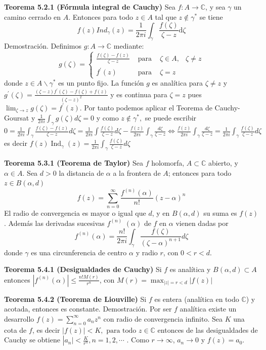 \documentclass[a4paper, 11pt]{extarticle}
\newcommand{\tma}[1]{\textcolor{rojo}{\textbf{Teorema #1}}}
\newcommand{\dem}[1]{\textcolor{gris}{\small{Demostración. #1}}}
\begin{document}
\begin{multicols*}{2}
\tma{5.2.1 (Fórmula integral de Cauchy)} Sea \(f: A \rightarrow  \mathbb{C}\),
y sea \(\gamma\) un camino cerrado en \(A\). Entonces para todo \(z \in A\) tal que \(z \not \in \gamma^*\)
 se tiene \[ f(z) Ind_\gamma(z) = \frac{1}{2\pi i}\int _\gamma
\frac{f(\zeta)}{\zeta - z} \text{d}\zeta   \]
\dem{  Definimos $g: A \rightarrow \mathbb{C}$ mediante:
$$
g(\zeta)=\left\{\begin{array}{cccc}
\frac{f(\zeta)-f(z)}{\zeta-z} & \text { para } & \zeta \in A, & \zeta \neq z \\
f^{\prime}(z) & \text { para } & \zeta=z
\end{array}\right.
$$
donde $z \in A \backslash \gamma^{*}$ es un punto fijo. La función $g$ es analítica para $\zeta \neq z$ y
$
g^{\prime}(\zeta)=\frac{(\zeta-z) f^{\prime}(\zeta)-f(\zeta)+f(z)}{(\zeta-z)^{2}}
$
y es continua para $\zeta=z$ pues
$
\lim _{\zeta \rightarrow z} g(\zeta)=f^{\prime}(z)
$.
Por tanto podemos aplicar el Teorema de Cauchy-Goursat y 
$
\frac{1}{2 \pi i} \int_{\gamma} g(\zeta) d \zeta=0
$ y como $z \notin \gamma^{*},$ se puede escribir
$
0 =\frac{1}{2 \pi i} \int_{\gamma} \frac{f(\zeta)-f(z)}{\zeta-z} d \zeta=\frac{1}{2 \pi i} \int \frac{f(\zeta)}{\zeta-z} d \zeta 
-\frac{f(z)}{2 \pi i} \int_{\gamma} \frac{d \zeta}{\zeta-z} \iff \frac{f(z)}{2 \pi i} 
\int_{\gamma} \frac{d \zeta}{\zeta-z}=\frac{1}{2 \pi i} \int_{\gamma} \frac{f(\zeta)}{\zeta-z} d \zeta
$
es decir
$f(z) \operatorname{Ind}_{\gamma}(z)=\frac{1}{2 \pi i} \int_{\gamma} \frac{f(\zeta)}{\zeta-z} d \zeta$ }

\tma{5.3.1 (Teorema de Taylor)} 
Sea \(f\) holomorfa, \(A \subset \mathbb{C}\) abierto,
y \(\alpha \in A\). Sea \(d>0\) la distancia de \(\alpha\) a la frontera de \(A\); 
entonces para todo \(z \in B(\alpha, d)\)
$$
f(z)=\sum_{n=0}^{\infty} \frac{f^{(n)}(\alpha)}{n !}(z-\alpha)^{n}
$$
El radio de convergencia es mayor o igual que
\(d\), y en \(B(\alpha, d)\) su suma es \(f(z)\). 
Además las derivadas sucesivas \(f^{(n)}\) \((\alpha)\) de \(f\) en \(\alpha\) vienen dadas por
$$
f^{(n)}(\alpha)=\frac{n !}{2 \pi i} \int_{\gamma} \frac{f(\zeta)}{(\zeta-\alpha)^{n+1}} d \zeta
$$
donde \(\gamma\) es una circunferencia de centro \(\alpha\) y radio \(r\), con
\(0<r<d\).

\tma{5.4.1 (Desigualdades de Cauchy)} Si \(f\) es analítica y \(B(\alpha, d)
\subset A\) entonces 
\(|f^{(n)}(\alpha)| \le \frac{n!M(r)}{r^n}\), con \(M(r) =
\max_{|z|=r<d}|f(z)|\)

\tma{5.4.2 (Teorema de Liouville)} Si \(f\) es entera (analítica en todo \(\mathbb{C}\)) y acotada, entonces es constante.
\dem{  Por ser $f$ analítica existe un desarrollo
$
f(z)=\sum_{n=0}^{\infty} a_{n} z^{n}
$
con radio de convergencia infinito. Sea $K$ una cota de $f$, es decir
$
|f(z)|<K, \text { para todo } z \in \mathbb{C}
$
entonces de las desigualdades de Cauchy se obtiene
$
\left|a_n|<\frac{K}{r^n}, n=1, 2, \cdots
$
. Como \( r \rightarrow \infty \), \( a_n \rightarrow 0 \) y \( f(z) = a_0 \). }


\end{multicols*}
\end{document}
